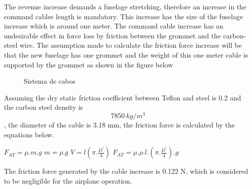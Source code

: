 The revenue increase demands a fuselage stretching, therefore an increase in the command cables length is mandatory. This increase has the size of the fuselage increase which is around one meter. The command cable increase has an undesirable effect in force loss by friction between the grommet and the carbon-steel wire. The assumption made to calculate the friction force increase will be that the new fuselage has one grommet and the weight of this one meter cable is supported by the grommet as shown in the figure below

\begin{figure}[H] %
\caption{Sistema de cabos}
\label{fig:Sistema}
\end{figure}


Assuming the dry static friction coefficient between Teflon and steel is 0.2 and the carbon steel density is \[7850\ kg/m^{3}\], the diameter of the cable is 3.18 mm, the friction force is calculated by the equations below.

$F_{AT}=\mu .m.g$ %
$m=\rho .g$ %
$V=l\left ( \pi .\frac{D^{^{2}}}{4} \right )$
$F_{AT}=\mu .\rho .l.\left ( \pi .\frac{D^{^{2}}}{4} \right ).g$

The friction force generated by the cable increase is 0.122 N, which is considered to be negligible for the airplane operation.
